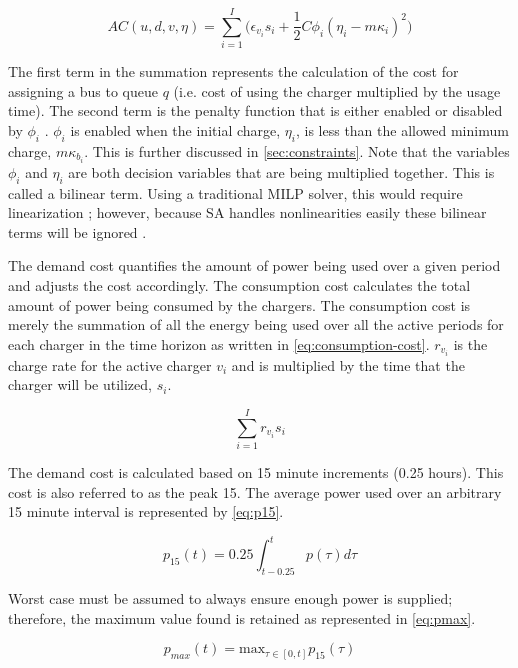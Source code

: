 \documentclass[ee,msthesis]{usuthesis}
\newcommand{\AC}{AC(u, d, v, \eta)}            %
\begin{document}
\begin{equation}
\label{eq:ac}
\AC = \sum_{i=1}^I \Big(\epsilon_{v_i}s_i + \frac{1}{2} C \phi_i (\eta_i - m \kappa_i)^{2}\Big)
\end{equation}

The first term in the summation represents the calculation of the cost for assigning a bus to queue \(q\) (i.e. cost of
using the charger multiplied by the usage time). The second term is the penalty function that is either enabled or
disabled by \(\phi_i\) \cite{luenberger-2008-penal-barrier-method}. \(\phi_i\) is enabled when the initial charge, \(\eta_i\), is less
than the allowed minimum charge, \(m\kappa_{b_i}\). This is further discussed in \ref{sec:constraints}. Note that the variables
\(\phi_i\) and \(\eta_i\) are both decision variables that are being multiplied together. This is called a bilinear term. Using a
traditional MILP solver, this would require linearization \cite{rodriguez-2013-compar-asses}; however, because SA handles
nonlinearities easily these bilinear terms will be ignored \cite{radosavljevic-2018-metah-optim}.

The demand cost quantifies the amount of power being used over a given period and adjusts the cost accordingly. The
consumption cost calculates the total amount of power being consumed by the chargers. The consumption cost is merely the
summation of all the energy being used over all the active periods for each charger in the time horizon as written in
\ref{eq:consumption-cost}. \(r_{v_i}\) is the charge rate for the active charger \(v_i\) and is multiplied by the time that the
charger will be utilized, \(s_i\).

\begin{equation}
\label{eq:consumption-cost}
  \sum_{i=1}^I r_{v_i}s_i
\end{equation}

The demand cost is calculated based on 15 minute increments (0.25 hours). This cost is also referred to as the peak 15. The
average power used over an arbitrary 15 minute interval is represented by \ref{eq:p15}.

\begin{equation}
\label{eq:p15}
p_{15}(t) = 0.25 \int_{t-0.25}^{t} p(\tau) d\tau
\end{equation}

Worst case must be assumed to always ensure enough power is supplied; therefore, the maximum value found is retained as
represented in \ref{eq:pmax}.

\begin{equation}
\label{eq:pmax}
p_{max}(t) = \text{max}_{\tau \in [0,t]}p_{15}(\tau)
\end{equation}
\end{document}
